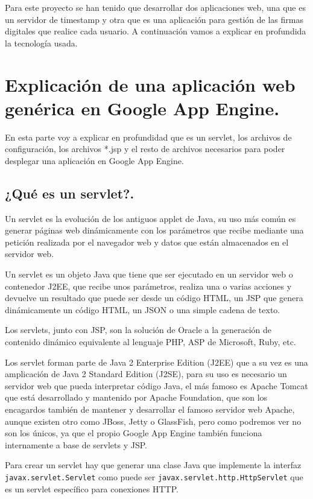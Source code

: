 Para este proyecto se han tenido que desarrollar dos aplicaciones web, una que es un servidor de timestamp y otra que es una aplicación para gestión de las firmas digitales que realice cada usuario. A continuación vamos a explicar en profundida la tecnología usada.

\section[Aplicación web genérica en GAE]{Explicación de una aplicación web genérica en Google App Engine.}
En esta parte voy a explicar en profundidad que es un servlet, los archivos de configuración, los archivos *.jsp y el resto de archivos necesarios para poder desplegar una aplicación en Google App Engine.
 
\subsection{¿Qué es un servlet?.}
Un servlet es la evolución de los antiguos applet de Java, su uso más común es generar páginas web dinámicamente con los parámetros que recibe mediante una petición realizada por el navegador web y datos que están almacenados en el servidor web.

Un servlet es un objeto Java que tiene que ser ejecutado en un servidor web o contenedor J2EE, que recibe unos parámetros, realiza una o varias acciones y devuelve un resultado que puede ser desde un código HTML, un JSP que genera dinámicamente un código HTML, un JSON o una simple cadena de texto.

Los servlets, junto con JSP, son la solución de Oracle a la generación de contenido dinámico equivalente al lenguaje PHP, ASP de Microsoft, Ruby, etc.

Los servlet forman parte de Java 2 Enterprise Edition (J2EE) que a su vez es una amplicación de Java 2 Standard Edition (J2SE), para su uso es necesario un servidor web que pueda interpretar código Java, el más famoso es Apache Tomcat que está desarrollado y mantenido por Apache Foundation, que son los encagardos también de mantener y desarrollar el famoso servidor web Apache, aunque existen otro como JBoss, Jetty o GlassFish, pero como podremos ver no son los únicos, ya que el propio Google App Engine también funciona internamente a base de servlets y JSP.

Para crear un servlet hay que generar una clase Java que implemente la interfaz \lstinline{javax.servlet.Servlet} como puede ser \lstinline{javax.servlet.http.HttpServlet} que es un servlet específico para conexiones HTTP.
 
